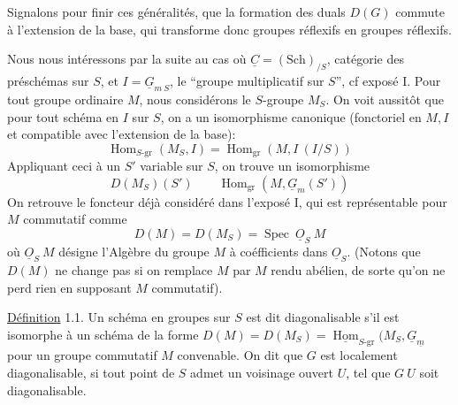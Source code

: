 Signalons pour finir ces généralités, que la formation des duals $D(G)$ commute à l'extension de la base, qui transforme donc groupes réflexifs en groupes réflexifs.

Nous nous intéressons par la suite au cas où $\underline C=(\mathrm{Sch})_{/S}$, catégorie des préschémas sur $S$, et $I=\underline G_{m\ S}$, le ``groupe multiplicatif sur $S$'', cf exposé I. Pour tout groupe  ordinaire $M$, nous considérons le $S$-groupe $M_S$. On voit aussitôt que pour tout schéma en  $I$ sur $S$, on a un isomorphisme canonique (fonctoriel en $M,I$ et compatible avec l'extension de la base):
\[
 \operatorname{Hom}_{S\text{-gr}}(M_S,I)=\operatorname{Hom}_{\mathrm{gr}}(M,I\ (I/S))
\]
Appliquant ceci à un $S'$ variable sur $S$, on trouve un isomorphisme 
\[
 D(M_S)(S')\qquad \operatorname{Hom}_{\mathrm{gr}}(M,\underline G_m(S'))
\]
On retrouve le foncteur déjà considéré dans l'exposé I,  qui est représentable  pour $M$ commutatif comme
\[
 D(M)=D(M_S)=\operatorname{Spec}\ \underline O_S\ M
\]
où $\underline O_S\ M$ désigne l'Algèbre du groupe $M$ à coéfficients dans $\underline O_S$. (Notons  que $D(M)$ ne change pas si on remplace $M$ par $M$ rendu  abélien, de sorte  qu'on ne perd rien en supposant $M$ commutatif).

\uline{Définition} 1.1. Un schéma en groupes  sur $S$ est dit diagonalisable s'il est isomorphe à un schéma de la forme  $D(M)=D(M_S)=\underline{\operatorname{Hom}}_{S\text{-gr}}(M_S,\underline G_{\underline m}$ pour un groupe commutatif $M$ convenable. On dit que $G$ est localement diagonalisable, si tout point de $S$ admet un voisinage ouvert $U$, tel que $G\ U$ soit diagonalisable.

